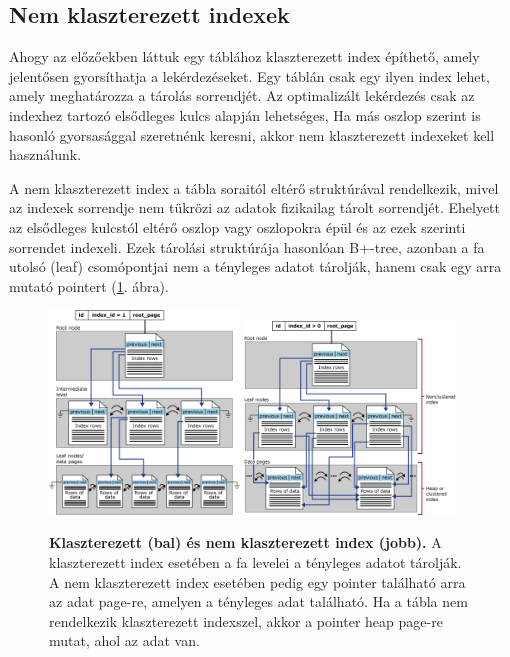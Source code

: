 \documentclass[12pt]{article}
\theoremstyle{plain}
\begin{document}
\subsection{Nem klaszterezett indexek}
Ahogy az előzőekben láttuk egy táblához klaszterezett index építhető, amely jelentősen gyorsíthatja a lekérdezéseket. Egy táblán csak egy ilyen index lehet, amely meghatározza a tárolás sorrendjét. Az optimalizált lekérdezés csak az indexhez tartozó elsődleges kulcs alapján lehetséges, Ha más oszlop szerint is hasonló gyorsasággal szeretnénk keresni, akkor nem klaszterezett indexeket kell használunk.
\par
A nem klaszterezett index a tábla soraitól eltérő struktúrával rendelkezik, mivel az indexek sorrendje nem tükrözi az adatok fizikailag tárolt sorrendjét. Ehelyett az elsődleges kulcstól eltérő oszlop vagy oszlopokra épül és az ezek szerinti sorrendet indexeli. Ezek tárolási struktúrája hasonlóan B+-tree, azonban a fa utolsó (leaf) csomópontjai nem a tényleges adatot tárolják, hanem csak egy arra mutató pointert (\ref{fig:idx}. ábra).

\begin{figure}[H]
    \begin{center}
    \includegraphics[width=0.45\textwidth]{media/cluster.png}
    \includegraphics[width=0.5\textwidth]{media/noncluster.png}
    \caption{\textbf{Klaszterezett (bal) és nem klaszterezett index (jobb).} A klaszterezett index esetében a fa levelei a tényleges adatot tárolják. A nem klaszterezett index esetében pedig egy pointer található arra az adat page-re, amelyen a tényleges adat található. Ha a tábla nem rendelkezik klaszterezett indexszel, akkor a pointer heap page-re mutat, ahol az adat van.} 
    \label{fig:idx}
    \end{center}
\end{figure}
\end{document}
